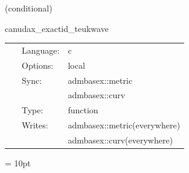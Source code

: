 \vspace{5mm}

   (conditional) 

\hspace{5mm} canudax\_exactid\_teukwave 

\hspace{5mm}{\it create teukolsky wave initial data } 


\hspace{5mm}

 \begin{tabular*}{160mm}{cll} 
~ & Language:  & c \\ 
~ & Options:  & local \\ 
~ & Sync:  & admbasex::metric \\ 
~& ~ &admbasex::curv\\ 
~ & Type:  & function \\ 
~ & Writes:  & admbasex::metric(everywhere) \\ 
~& ~ &admbasex::curv(everywhere)\\ 
\end{tabular*} 



\vspace{5mm}\parskip = 10pt 
